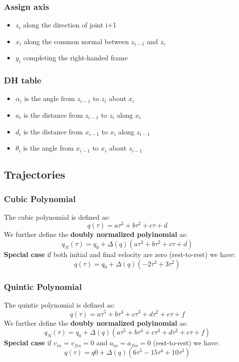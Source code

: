 \documentclass[a4paper,12pt]{article}
\begin{document}
\subsubsection{Assign axis}
\begin{itemize}
    \item $z_i$ along the direction of joint i+1
    \item $x_i$ along the common normal between $z_{i-1}$ and $z_i$
    \item $y_i$ completing the right-handed frame
\end{itemize}
\subsubsection{DH table}
\begin{itemize}
    \item $\alpha_i$ is the angle from $z_{i-1}$ to $z_i$ about $x_i$
    \item $a_i$ is the distance from $z_{i-1}$ to $z_i$ along $x_i$
    \item $d_i$ is the distance from $x_{i-1}$ to $x_i$ along $z_{i-1}$
    \item $\theta_i$ is the angle from $x_{i-1}$ to $x_i$ about $z_{i-1}$
\end{itemize}
\subsection{Trajectories} \label{sec:Trajectories}
\subsubsection{Cubic Polynomial}
The cubic polynomial is defined as:
\begin{equation}
    q(\tau)= a\tau^3+b\tau^2+c\tau+d
\end{equation}
We further define the \textbf{doubly normalized polyinomial} as:
\begin{equation}
    q_N(\tau)= q_0 + \Delta(q)(a\tau^3+b\tau^2+c\tau+d)
\end{equation}
\textbf{Special case} if both initial and final velocity are zero (rest-to-rest) we have:
\begin{equation}
    q(\tau)= q_0 + \Delta(q)(-2\tau^3+3\tau^2)
\end{equation}
\subsubsection{Quintic Polynomial}
The quintic polynomial is defined as:
\begin{equation}
    q(\tau)= a\tau^5+b\tau^4+c\tau^3+d\tau^2+e\tau+f
\end{equation}
We further define the \textbf{doubly normalized polyinomial} as:
\begin{equation}
    q_N(\tau)= q_0 + \Delta(q)(a\tau^5+b\tau^4+c\tau^3+d\tau^2+e\tau+f)
\end{equation}
\textbf{Special case} if $v_{in}=v_{fin}=0$ and $a_{in}=a_{fin}=0$ (rest-to-rest) we have:
\begin{equation}
    q(\tau)=q0 + \Delta(q)(6\tau^5-15\tau^4+10\tau^3)
\end{equation}
\end{document}
